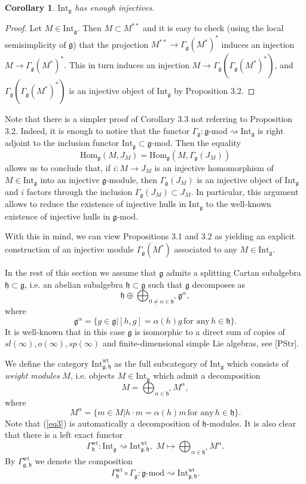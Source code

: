 \documentclass{birkmult}
\newcounter{theorem}
\newtheorem{corollary}[theo]{Corollary}
\newcommand{\hh}{\mathfrak{h}}
\renewcommand{\gg}{\mathfrak{g}}
\newcommand{\refeq}[1]{(\ref{#1})}
\newcommand{\Int}{\mathrm{Int}}
\newcommand{\Intwt}{\Int^{\mathrm{wt}}_{\gg,\hh}}
\renewcommand{\hom}{\mathrm{Hom}}
\begin{document}
 \begin{corollary}\label{hull} 
$\Int_\gg$ has enough injectives. 
\end{corollary}

\begin{proof}
Let $M\in\Int_\gg$. Then
$M\subset M^{**}$ and it is easy to check (using the local semisimplicity
of $\gg$) that the projection $M^{**}\rightarrow \Gamma_{\gg}(M^*)^*$
induces an injection $M\rightarrow \Gamma_{\gg}(M^*)^*$. This in turn induces
an injection $M\rightarrow \Gamma_{\gg}(\Gamma_{\gg}(M^*)^*)$, and $\Gamma_{\gg}(\Gamma_{\gg}(M^*)^*)$ is an injective
object of $\Int_\gg$ by Proposition 3.2.
\end{proof}

Note that there is a simpler proof of Corollary 3.3 not
referring to Proposition 3.2. Indeed, it is enough to notice that
the functor $\Gamma_\gg :\gg$-mod$\rightsquigarrow \Int_\gg$ is right adjoint
to the inclusion functor $\Int_\gg\subset\gg$-mod. Then the
equality $$\hom_\gg(M,J_M)=\hom_\gg(M,\Gamma_\gg(J_M))$$
allows us to conclude that, if $i:M\rightarrow J_M$ is an
injective homomorphism of $M\in\Int_\gg$ into an injective
$\gg$-module, then $\Gamma_\gg(J_M)$ is an injective object
of $\Int_\gg$ and $i$ factors through the inclusion $\Gamma_\gg(J_M)\subset J_M$.
In particular, this argument allows to reduce the existence of
injective hulls in $\Int_\gg$ to the well-known existence of
injective hulls in $\gg$-mod.

With this in mind, we can view Propositions 3.1 and 3.2 as yielding
an explicit construction of an injective module $\Gamma_\gg(M^*)$
associated to any $M\in\Int_\gg$.

In the rest of this section we assume that $\gg$ admits a
splitting Cartan subalgebra $\hh\subset\gg$, i.e. an abelian
subalgebra $\hh\subset\gg$ such that $\gg$ decomposes as
$$\hh\oplus\bigoplus_{0\neq\alpha\in\hh^*}\gg^\alpha,$$
where $$\gg^\alpha=\{g\in \gg | [h,g]=\alpha(h)g\,\text{for
any}\,h\in\hh\}.$$ It is well-known that in this case $\gg$ is
isomorphic to a direct sum of copies of
$sl(\infty),o(\infty),sp(\infty)$ and finite-dimensional simple
Lie algebras, see [PStr].

We define the category $\Intwt$ as the full subcategory of
$\Int_\gg$ which consists of {\it weight modules} $M$, i.e.
objects $M\in\Int_\gg$ which admit a decomposition
\begin{equation}\label{eq3}M=\bigoplus_{\alpha\in\hh^*}M^\alpha,\end{equation} where
$$M^\alpha=\{m\in M | h\cdot m=\alpha(h)m\,\text{for any}\,h\in\hh\}.$$
Note that \refeq{eq3} is automatically a decomposition of
$\hh$-modules. It is also clear that there is a left exact functor
$$\Gamma^{\mathrm{wt}}_\hh:\Int_\gg\rightsquigarrow \Intwt,\,\, M\mapsto \bigoplus_{\alpha\in\hh^*}M^\alpha.$$
By $\Gamma^{\mathrm{wt}}_{\gg,\hh}$ we denote the composition
$$\Gamma^{\mathrm{wt}}_\hh\circ \Gamma_\gg:\gg\text{-mod} \rightsquigarrow \Intwt.$$
\end{document}
